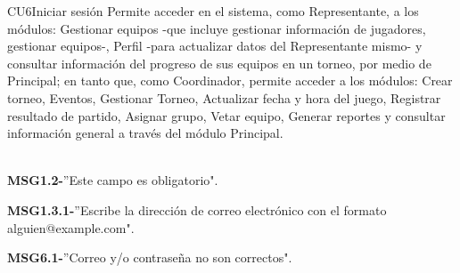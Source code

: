 
	\begin{UseCase}{CU6}{Iniciar sesión}{
		Permite acceder en el sistema, como Representante, a los módulos: Gestionar equipos -que incluye gestionar información de jugadores, gestionar equipos-, Perfil -para actualizar datos del Representante mismo- y consultar información del progreso de sus equipos en un torneo, por medio de Principal; en tanto que, como Coordinador, permite acceder a los módulos: Crear torneo, Eventos, Gestionar Torneo, Actualizar fecha y hora del juego, Registrar resultado de partido, Asignar grupo, Vetar equipo, Generar reportes y consultar información general a través del módulo Principal.
		\\ \\
		}
		{
			\begin{Citemize}
				\item {\bf MSG1.2-}''Este campo es obligatorio".
				\item {\bf MSG1.3.1-}''Escribe la dirección de correo electrónico con el formato alguien@example.com".
				\item {\bf MSG6.1-}''Correo y/o contraseña no son correctos".
			\end{Citemize}
		}		
	\end{UseCase}
